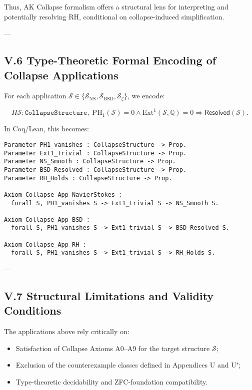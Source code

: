 \documentclass[11pt]{article}
\begin{document}
Thus, AK Collapse formalism offers a structural lens for interpreting and potentially resolving RH, conditional on collapse-induced simplification.

---

\subsection*{V.6 Type-Theoretic Formal Encoding of Collapse Applications}

For each application $\mathcal{S} \in \{\mathcal{S}_{\mathrm{NS}}, \mathcal{S}_{\mathrm{BSD}}, \mathcal{S}_{\zeta}\}$, we encode:

\[
\Pi \mathcal{S} : \texttt{CollapseStructure},\;
\mathrm{PH}_1(\mathcal{S}) = 0 \wedge \mathrm{Ext}^1(\mathcal{S}, \mathbb{Q}) = 0
\Rightarrow
\mathsf{Resolved}(\mathcal{S}).
\]

In Coq/Lean, this becomes:

\begin{lstlisting}[language=Coq]
Parameter PH1_vanishes : CollapseStructure -> Prop.
Parameter Ext1_trivial : CollapseStructure -> Prop.
Parameter NS_Smooth : CollapseStructure -> Prop.
Parameter BSD_Resolved : CollapseStructure -> Prop.
Parameter RH_Holds : CollapseStructure -> Prop.

Axiom Collapse_App_NavierStokes :
  forall S, PH1_vanishes S -> Ext1_trivial S -> NS_Smooth S.

Axiom Collapse_App_BSD :
  forall S, PH1_vanishes S -> Ext1_trivial S -> BSD_Resolved S.

Axiom Collapse_App_RH :
  forall S, PH1_vanishes S -> Ext1_trivial S -> RH_Holds S.
\end{lstlisting}

---

\subsection*{V.7 Structural Limitations and Validity Conditions}

The applications above rely critically on:

\begin{itemize}
    \item Satisfaction of Collapse Axioms A0–A9 for the target structure $\mathcal{S}$;
    \item Exclusion of the counterexample classes defined in Appendices U and U⁺;
    \item Type-theoretic decidability and ZFC-foundation compatibility.
\end{itemize}
\end{document}
